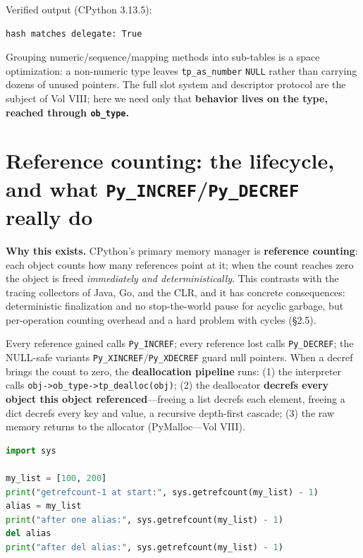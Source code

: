 Verified output (CPython 3.13.5):

\begin{lstlisting}[caption={Output}]
hash matches delegate: True
\end{lstlisting}

Grouping numeric/sequence/mapping methods into sub-tables is a space optimization: a
non-numeric type leaves \texttt{tp\_as\_number} \texttt{NULL} rather than carrying dozens of
unused pointers. The full slot system and descriptor protocol are the subject of Vol VIII;
here we need only that \textbf{behavior lives on the type, reached through
\texttt{ob\_type}.}

\section{Reference counting: the lifecycle, and what \texttt{Py\_INCREF}/\texttt{Py\_DECREF} really do}

\textbf{Why this exists.} CPython's primary memory manager is \textbf{reference counting}:
each object counts how many references point at it; when the count reaches zero the object is
freed \emph{immediately and deterministically}. This contrasts with the tracing collectors of
Java, Go, and the CLR, and it has concrete consequences: deterministic finalization and no
stop-the-world pause for acyclic garbage, but per-operation counting overhead and a hard
problem with cycles (§2.5).

Every reference gained calls \texttt{Py\_INCREF}; every reference lost calls
\texttt{Py\_DECREF}; the NULL-safe variants \texttt{Py\_XINCREF}/\texttt{Py\_XDECREF} guard
null pointers. When a decref brings the count to zero, the \textbf{deallocation pipeline}
runs: (1) the interpreter calls \texttt{obj->ob\_type->tp\_dealloc(obj)}; (2) the
deallocator \textbf{decrefs every object this object referenced}---freeing a list decrefs
each element, freeing a dict decrefs every key and value, a recursive depth-first cascade;
(3) the raw memory returns to the allocator (PyMalloc---Vol VIII).

\begin{lstlisting}[language=Python, caption={Reference counting is observable; subtract 1 for getrefcount's own argument ref.}]
import sys

my_list = [100, 200]
print("getrefcount-1 at start:", sys.getrefcount(my_list) - 1)
alias = my_list
print("after one alias:", sys.getrefcount(my_list) - 1)
del alias
print("after del alias:", sys.getrefcount(my_list) - 1)
\end{lstlisting}

